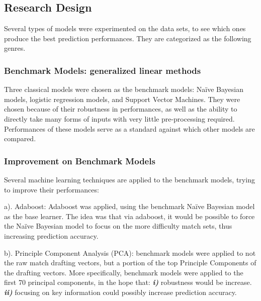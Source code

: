 \documentclass{article}
\begin{document}
\subsection{Research Design}
Several types of models were experimented on the data sets, to see which ones produce the best prediction performances. They are categorized as the following genres.

\subsubsection{Benchmark Models: generalized linear methods}
Three classical models were chosen as the benchmark models: Naïve Bayesian models, logistic regression models, and Support Vector Machines. They were chosen because of their robustness in performances, as well as the ability to directly take many forms of inputs with very little pre-processing required. Performances of these models serve as a standard against which other models are compared.

\subsubsection{Improvement on Benchmark Models}
Several machine learning techniques are applied to the benchmark models, trying to improve their performances:

a). Adaboost: Adaboost was applied, using the benchmark Naïve Bayesian model as the base learner. The idea was that via adaboost, it would be possible to force the Naïve Bayesian model to focus on the more difficulty match sets, thus increasing prediction accuracy.
    
b). Principle Component Analysis (PCA): benchmark models were applied to not the raw match drafting vectors, but a portion of the top Principle Components of the drafting vectors. More specifically, benchmark models were applied to the first 70 principal components, in the hope that: \textbf{\textit{i)}} robustness would be increase. \textbf{\textit{ii)}} focusing on key information could possibly increase prediction accuracy.
    
\end{document}
